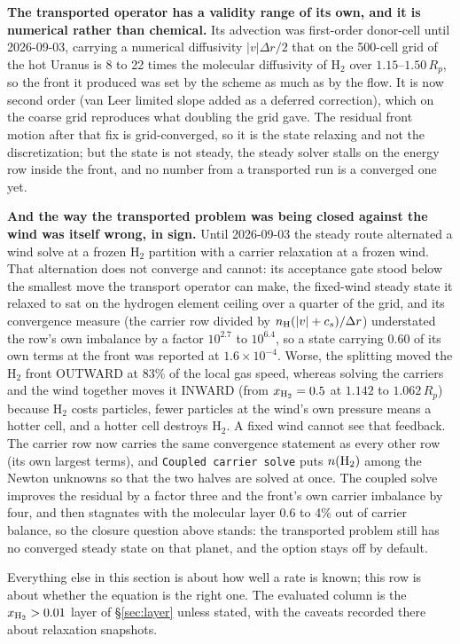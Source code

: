 \documentclass[english,a4paper]{my_memo}
\begin{document}
\textbf{The transported operator has a validity range of its own, and it is
numerical rather than chemical.} Its advection was first-order donor-cell until
2026-09-03, carrying a numerical diffusivity $|v|\Delta r/2$ that on the
500-cell grid of the hot Uranus is 8 to 22 times the molecular diffusivity of
H$_2$ over $1.15$--$1.50\,R_p$, so the front it produced was set by the scheme
as much as by the flow. It is now second order (van Leer limited slope added
as a deferred correction), which on the coarse grid reproduces what doubling
the grid gave. The residual front motion after that fix is grid-converged, so
it is the state relaxing and not the discretization; but the state is not
steady, the steady solver stalls on the energy row inside the front, and no
number from a transported run is a converged one yet.

\textbf{And the way the transported problem was being closed against the wind
was itself wrong, in sign.} Until 2026-09-03 the steady route alternated a wind
solve at a frozen H$_2$ partition with a carrier relaxation at a frozen wind.
That alternation does not converge and cannot: its acceptance gate stood below
the smallest move the transport operator can make, the fixed-wind steady state
it relaxed to sat on the hydrogen element ceiling over a quarter of the grid,
and its convergence measure (the carrier row divided by
$n_{\rm H}(|v|+c_s)/\Delta r$) understated the row's own imbalance by a
factor $10^{2.7}$ to $10^{6.4}$, so a state carrying $0.60$ of its own terms at
the front was reported at $1.6\times10^{-4}$. Worse, the splitting moved the
H$_2$ front OUTWARD at 83\% of the local gas speed, whereas solving the
carriers and the wind together moves it INWARD (from $x_{\rm H_2}=0.5$ at
$1.142$ to $1.062\,R_p$) because H$_2$ costs particles, fewer particles at
the wind's own pressure means a hotter cell, and a hotter cell destroys H$_2$.
A fixed wind cannot see that feedback. The carrier row now carries the same
convergence statement as every other row (its own largest terms), and
\texttt{Coupled carrier solve} puts $n({\rm H_2})$ among the Newton unknowns
so that the two halves are solved at once.
The coupled solve improves the
residual by a factor three and the front's own carrier imbalance by four, and
then stagnates with the molecular layer 0.6 to 4\% out of carrier balance, so
the closure question above stands: the transported problem still has no
converged steady state on that planet, and the option stays off by default.

Everything else in
this section is about how well a rate is known; this row is about whether the
equation is the right one. The evaluated column is the
$x_{\rm H_2} > 0.01$ layer of \S\ref{sec:layer} unless stated, with the
caveats recorded there about relaxation snapshots.
\end{document}
